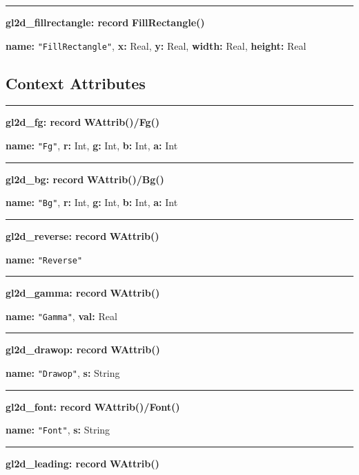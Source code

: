 \documentclass[letterpaper,12pt]{article}
\begin{document}
\bigskip\hrule\vspace{0.1cm}
\noindent
{\bf gl2d\_fillrectangle: record} \hfill {\bf FillRectangle()}

{\bf name:} \texttt{"FillRectangle"},\newline\indent
{\bf x:} Real,
{\bf y:} Real,
{\bf width:} Real,
{\bf height:} Real

%
%
\subsection{Context Attributes}

\bigskip\hrule\vspace{0.1cm}
\noindent
{\bf gl2d\_fg: record} \hfill {\bf WAttrib()/Fg()}

{\bf name:} \texttt{"Fg"},\newline\indent
{\bf r:} Int,
{\bf g:} Int,
{\bf b:} Int,
{\bf a:} Int

\bigskip\hrule\vspace{0.1cm}
\noindent
{\bf gl2d\_bg: record} \hfill {\bf WAttrib()/Bg()}

{\bf name:} \texttt{"Bg"},\newline\indent
{\bf r:} Int,
{\bf g:} Int,
{\bf b:} Int,
{\bf a:} Int

\bigskip\hrule\vspace{0.1cm}
\noindent
{\bf gl2d\_reverse: record} \hfill {\bf WAttrib()}

{\bf name:} \texttt{"Reverse"}

\bigskip\hrule\vspace{0.1cm}
\noindent
{\bf gl2d\_gamma: record} \hfill {\bf WAttrib()}

{\bf name:} \texttt{"Gamma"},\newline\indent
{\bf val:} Real

\bigskip\hrule\vspace{0.1cm}
\noindent
{\bf gl2d\_drawop: record} \hfill {\bf WAttrib()}

{\bf name:} \texttt{"Drawop"},\newline\indent
{\bf s:} String 

\bigskip\hrule\vspace{0.1cm}
\noindent
{\bf gl2d\_font: record} \hfill {\bf WAttrib()/Font()}

{\bf name:} \texttt{"Font"},\newline\indent
{\bf s:} String 

\bigskip\hrule\vspace{0.1cm}
\noindent
{\bf gl2d\_leading: record} \hfill {\bf WAttrib()}
\end{document}
